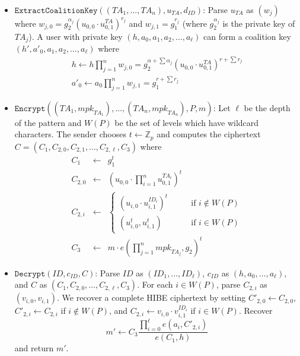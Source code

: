 \documentclass{llncs}
\newcommand{\Zbb}{\mathbb{Z}}
\newcommand{\ID}{\mathit{ID}}
\newcommand{\TA}{\mathit{TA}}
\newcommand{\mpk}{\mathit{mpk}}
\begin{document}
\begin{itemize}
\item
$\texttt{ExtractCoalitionKey}((\TA_{1},\ldots,\TA_{n}),u_{\TA},d_{\ID})$: Parse $u_{\TA}$ as $(w_{j})$ where $w_{j,0} = g_{2}^{\alpha_{j}}(u_{0,0} \cdot u_{0,1}^{\TA})^{r_{j}}$ and $w_{j,1} = g_{1}^{r_{j}}$ (where $g_{2}^{\alpha_{j}}$ is the private key of $\TA_{j}$). A user with private key $(h,a_{0},a_{1},a_{2},\ldots,a_{\ell})$ can form a coalition key $(h',a'_{0},a_{1},a_{2},\ldots,a_{\ell})$ where
\begin{displaymath}
\begin{array}{c}
h \gets h \prod_{j=1}^{n} w_{j,0} = g_{2}^{\alpha + \sum \alpha_{j}}(u_{0,0} \cdot u_{0,1}^{\TA})^{r + \sum r_{j}} \\
a'_{0} \gets a_{0} \prod_{j=1}^{n} w_{j,1} = g_{1}^{r+\sum r_{j}}
\end{array}
\end{displaymath}
\item $\texttt{Encrypt}((\TA_{1},\mpk_{\TA_{1}}),\ldots,(\TA_{n},\mpk_{\TA_{n}}),\mathit{P},m)$:
    Let $\ell$ be the depth of the pattern and $W(P)$ be the set of levels which have wildcard characters. The sender chooses $t\gets \Zbb_{p}$ and computes the ciphertext $C=(C_{1},C_{2,0},C_{2,1},...,C_{2,\ell},C_{3})$ where
    \begin{displaymath}
    \begin{array}{lcl}
    C_{1} &\gets& g_{1}^{t} \\
    C_{2,0} &\gets& (u_{0,0}\cdot \prod_{i=1}^{n} u_{0,1}^{\TA_{i}})^{t}\\
    C_{2,i} &\gets& \left\{
    \begin{array}{ll}
    (u_{i,0} \cdot u_{i,1}^{\ID_{i}})^{t} & \qquad \mbox{if } i \notin W(P) \\
    (u_{i,0}^{t},u_{i,1}^{t}) & \qquad \mbox{if } i \in W(P)
    \end{array}
    \right. \\
    C_{3} &\gets& m \cdot e(\prod_{j=1}^{n} \mpk_{\TA_{j}},g_{2})^{t}
    \end{array}
    \end{displaymath}
\item $\texttt{Decrypt}(\ID,c_{\ID},C)$: Parse $\ID$ as $(\ID_{1},\ldots,\ID_{\ell})$, $c_{\ID}$ as $(h,a_{0},\ldots,a_{\ell})$, and $C$ as $(C_{1},C_{2,0},\ldots,C_{2,\ell},C_{3})$. For each $i\in W(P)$, parse $C_{2,i}$ as $(v_{i,0},v_{i,1})$. We recover a complete HIBE ciphertext by setting $C'_{2,0} \gets C_{2,0}$, $C'_{2,i} \gets C_{2,i}$ if $i\notin W(P)$, and $C_{2,i}\gets v_{i,0} \cdot v_{i,1}^{\ID_{i}}$ if $i\in W(P)$. Recover
    \begin{displaymath}
    m' \gets C_{3} \frac{\prod_{i=0}^{\ell} e(a_{i},C'_{2,i})}{e(C_{1},h)}
    \end{displaymath}
    and return $m'$.
\end{itemize}
\end{document}
